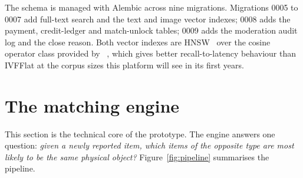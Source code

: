The schema is managed with Alembic across nine migrations. Migrations 0005 to
0007 add full-text search and the text and image vector indexes; 0008 adds the
payment, credit-ledger and match-unlock tables; 0009 adds the moderation audit
log and the  close reason. Both vector indexes are
HNSW~\cite{malkov2020hnsw} over the cosine operator class provided by
~\cite{pgvector}, which gives better recall-to-latency behaviour
than IVFFlat at the corpus sizes this platform will see in its first years.

\section{The matching engine}

This section is the technical core of the prototype. The engine answers one
question: \emph{given a newly reported item, which items of the opposite type
are most likely to be the same physical object?} Figure~\ref{fig:pipeline}
summarises the pipeline.

